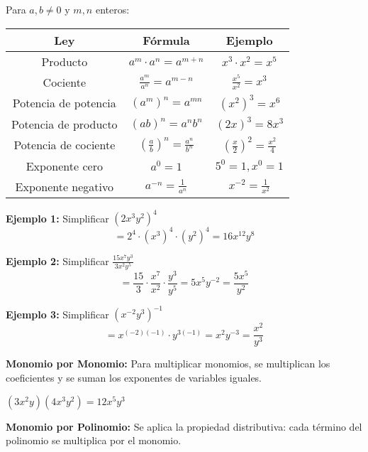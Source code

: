 \begin{theorem}
Para $a, b \neq 0$ y $m, n$ enteros:

\begin{center}
\begin{tabular}{|c|c|c|}
\hline
\textbf{Ley} & \textbf{Fórmula} & \textbf{Ejemplo} \\
\hline
Producto & $a^m \cdot a^n = a^{m+n}$ & $x^3 \cdot x^2 = x^5$ \\
\hline
Cociente & $\frac{a^m}{a^n} = a^{m-n}$ & $\frac{x^5}{x^2} = x^3$ \\
\hline
Potencia de potencia & $(a^m)^n = a^{mn}$ & $(x^2)^3 = x^6$ \\
\hline
Potencia de producto & $(ab)^n = a^n b^n$ & $(2x)^3 = 8x^3$ \\
\hline
Potencia de cociente & $\left(\frac{a}{b}\right)^n = \frac{a^n}{b^n}$ & $\left(\frac{x}{2}\right)^2 = \frac{x^2}{4}$ \\
\hline
Exponente cero & $a^0 = 1$ & $5^0 = 1, x^0 = 1$ \\
\hline
Exponente negativo & $a^{-n} = \frac{1}{a^n}$ & $x^{-2} = \frac{1}{x^2}$ \\
\hline
\end{tabular}
\end{center}
\end{theorem}

\begin{example}
\textbf{Ejemplo 1:} Simplificar $(2x^3y^2)^4$
$$= 2^4 \cdot (x^3)^4 \cdot (y^2)^4 = 16x^{12}y^8$$

\noindent \textbf{Ejemplo 2:} Simplificar $\frac{15x^7y^3}{3x^2y^5}$
$$= \frac{15}{3} \cdot \frac{x^7}{x^2} \cdot \frac{y^3}{y^5} = 5x^5y^{-2} = \frac{5x^5}{y^2}$$

\noindent \textbf{Ejemplo 3:} Simplificar $(x^{-2}y^3)^{-1}$
$$= x^{(-2)(-1)} \cdot y^{3(-1)} = x^2y^{-3} = \frac{x^2}{y^3}$$
\end{example}


\textbf{Monomio por Monomio:}
Para multiplicar monomios, se multiplican los coeficientes y se suman los exponentes de variables iguales.

\begin{example}
$(3x^2y)(4x^3y^2) = 12x^5y^3$
\end{example}

\textbf{Monomio por Polinomio:}
Se aplica la propiedad distributiva: cada término del polinomio se multiplica por el monomio.

